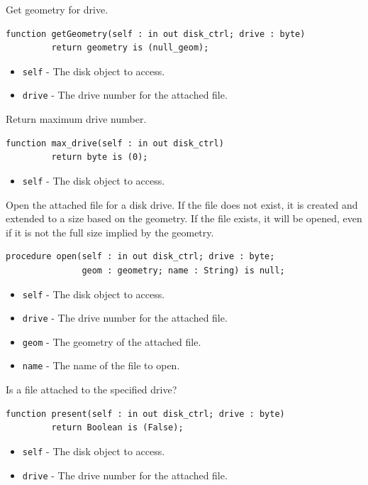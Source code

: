 \documentclass[10pt, openany]{book}
\newcommand{\keyword}[1]{\texttt{#1}}
\begin{document}
Get geometry for drive.
\begin{lstlisting}
function getGeometry(self : in out disk_ctrl; drive : byte)
         return geometry is (null_geom);
\end{lstlisting}
\begin{itemize}
  \item \keyword{self} - The disk object to access.
  \item \keyword{drive} - The drive number for the attached file.
\end{itemize}

Return maximum drive number.
\begin{lstlisting}
function max_drive(self : in out disk_ctrl)
         return byte is (0);
\end{lstlisting}
\begin{itemize}
  \item \keyword{self} - The disk object to access.
\end{itemize}

Open the attached file for a disk drive.
If the file does not exist, it is created and extended to a size based on the geometry.
If the file exists, it will be opened, even if it is not the full size implied by the geometry.
\begin{lstlisting}
procedure open(self : in out disk_ctrl; drive : byte;
               geom : geometry; name : String) is null;
\end{lstlisting}
\begin{itemize}
  \item \keyword{self} - The disk object to access.
  \item \keyword{drive} - The drive number for the attached file.
  \item \keyword{geom} - The geometry of the attached file.
  \item \keyword{name} - The name of the file to open.
\end{itemize}

Is a file attached to the specified drive?
\begin{lstlisting}
function present(self : in out disk_ctrl; drive : byte)
         return Boolean is (False);
\end{lstlisting}
\begin{itemize}
  \item \keyword{self} - The disk object to access.
  \item \keyword{drive} - The drive number for the attached file.
\end{itemize}
\end{document}
